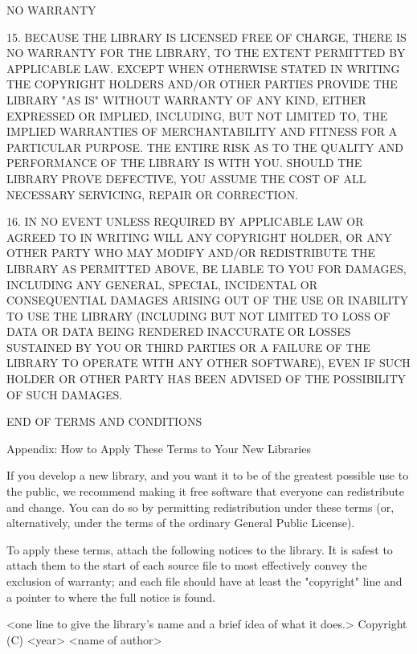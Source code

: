 \documentclass[a4paper,twoside]{tceusermanual}
\begin{document}
\begin{center}
NO WARRANTY
\end{center}

  15. BECAUSE THE LIBRARY IS LICENSED FREE OF CHARGE, THERE IS NO
WARRANTY FOR THE LIBRARY, TO THE EXTENT PERMITTED BY APPLICABLE LAW.
EXCEPT WHEN OTHERWISE STATED IN WRITING THE COPYRIGHT HOLDERS AND/OR
OTHER PARTIES PROVIDE THE LIBRARY "AS IS" WITHOUT WARRANTY OF ANY KIND,
EITHER EXPRESSED OR IMPLIED, INCLUDING, BUT NOT LIMITED TO, THE
IMPLIED WARRANTIES OF MERCHANTABILITY AND FITNESS FOR A PARTICULAR
PURPOSE.  THE ENTIRE RISK AS TO THE QUALITY AND PERFORMANCE OF THE
LIBRARY IS WITH YOU.  SHOULD THE LIBRARY PROVE DEFECTIVE, YOU ASSUME
THE COST OF ALL NECESSARY SERVICING, REPAIR OR CORRECTION.

  16. IN NO EVENT UNLESS REQUIRED BY APPLICABLE LAW OR AGREED TO IN
WRITING WILL ANY COPYRIGHT HOLDER, OR ANY OTHER PARTY WHO MAY MODIFY
AND/OR REDISTRIBUTE THE LIBRARY AS PERMITTED ABOVE, BE LIABLE TO YOU
FOR DAMAGES, INCLUDING ANY GENERAL, SPECIAL, INCIDENTAL OR CONSEQUENTIAL
DAMAGES ARISING OUT OF THE USE OR INABILITY TO USE THE
LIBRARY (INCLUDING BUT NOT LIMITED TO LOSS OF DATA OR DATA BEING
RENDERED INACCURATE OR LOSSES SUSTAINED BY YOU OR THIRD PARTIES OR A
FAILURE OF THE LIBRARY TO OPERATE WITH ANY OTHER SOFTWARE), EVEN IF
SUCH HOLDER OR OTHER PARTY HAS BEEN ADVISED OF THE POSSIBILITY OF SUCH DAMAGES.

\begin{center}
END OF TERMS AND CONDITIONS
\end{center}

\begin{center}
Appendix: How to Apply These Terms to Your New Libraries
\end{center}

If you develop a new library, and you want it to be of the
greatest possible use to the public, we recommend making it free
software that everyone can redistribute and change.  You can do
so by permitting redistribution under these terms (or,
alternatively, under the terms of the ordinary General Public
License).

To apply these terms, attach the following notices to the
library.  It is safest to attach them to the start of each
source file to most effectively convey the exclusion of
warranty; and each file should have at least the "copyright"
line and a pointer to where the full notice is found.

    <one line to give the library's name and a brief idea of what it does.>
    Copyright (C) <year>  <name of author>
\end{document}
